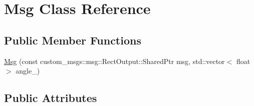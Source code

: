 \hypertarget{classMsg}{}\section{Msg Class Reference}
\label{classMsg}
\subsection*{Public Member Functions}
\begin{DoxyCompactItemize}
\item 
\hyperlink{classMsg_adccb11ca415299593832ae88cf1472b0}{Msg} (const custom\+\_\+msgs\+::msg\+::\+Rect\+Output\+::\+Shared\+Ptr msg, std\+::vector$<$ float $>$ angle\+\_\+)
\end{DoxyCompactItemize}
\subsection*{Public Attributes}
